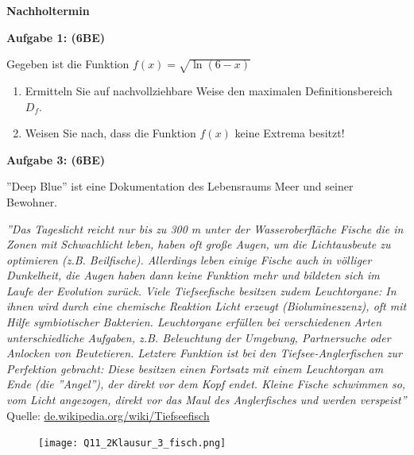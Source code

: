 \documentclass[a4paper,12pt]{article}
\newcommand{\Aufgabe}[1]{
  {
  \vspace*{0.5cm}
  \textsf{\textbf{Aufgabe #1}}
  \vspace*{0.2cm}
  
  }
}
\begin{document}
\newpage

\textbf{Nachholtermin}

\Aufgabe{1: (6BE)}

Gegeben ist die Funktion $f\left(x\right)=\sqrt{\ln (6-x)}$

\begin{enumerate}[label={\alph*)}]
\item Ermitteln Sie auf nachvollziehbare Weise den maximalen Definitionsbereich $D_f$.
\item Weisen Sie nach, dass die Funktion $f(x)$ keine Extrema besitzt!
\end{enumerate}


\Aufgabe{3: (6BE)} 

''Deep Blue'' ist eine Dokumentation des Lebensraums Meer und seiner Bewohner. \\


\begin{minipage}[t]{0.8\textwidth}
\textit{''Das Tageslicht reicht nur bis zu 300 m unter der Wasseroberfläche Fische die in Zonen mit Schwachlicht leben, haben oft große Augen, um die Lichtausbeute zu optimieren (z.B. Beilfische). Allerdings leben einige Fische auch in völliger Dunkelheit, die Augen haben dann keine Funktion mehr und bildeten sich im Laufe der Evolution zurück. Viele Tiefseefische besitzen zudem Leuchtorgane: In ihnen wird durch eine chemische Reaktion Licht erzeugt (Biolumineszenz), oft mit Hilfe symbiotischer Bakterien. Leuchtorgane erfüllen bei verschiedenen Arten unterschiedliche Aufgaben, z.B. Beleuchtung der Umgebung, Partnersuche oder Anlocken von Beutetieren. Letztere Funktion ist bei den Tiefsee-Anglerfischen zur Perfektion gebracht: Diese besitzen einen Fortsatz mit einem Leuchtorgan am Ende (die ''Angel''), der direkt vor dem Kopf endet. Kleine Fische schwimmen so, vom Licht angezogen, direkt vor das Maul des Anglerfisches und werden verspeist''}\\
Quelle: \href{https://de.wikipedia.org/wiki/Tiefseefisch}{de.wikipedia.org/wiki/Tiefseefisch}\\
\end{minipage}
\begin{minipage}[t]{0.27\textwidth}
  \begin{figure}[H]
    \centering
    \texttt{[image: Q11\_2Klausur\_3\_fisch.png]}
  \end{figure}
\end{minipage}
\end{document}
